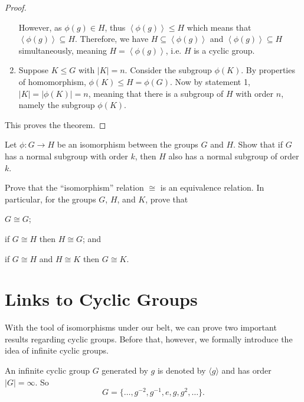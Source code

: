 \begin{proof}
\begin{enumerate}
        However, as $\phi(g) \in H$, thus $\left\langle \phi(g) \right\rangle \leq H$ which means that $\left\langle \phi(g) \right\rangle \subseteq H$. Therefore, we have $H \subseteq \left\langle \phi(g) \right\rangle$ and $\left\langle \phi(g) \right\rangle \subseteq H$ simultaneously, meaning $H = \left\langle \phi(g) \right\rangle$, i.e. $H$ is a cyclic group.

        \item Suppose $K \leq G$ with $|K| = n$. Consider the subgroup $\phi(K)$. By properties of homomorphism, $\phi(K) \leq H = \phi(G)$. Now by statement 1, $|K| = |\phi(K)| = n$, meaning that there is a subgroup of $H$ with order $n$, namely the subgroup $\phi(K)$.
    \end{enumerate}

    This proves the theorem.
\end{proof}

\begin{exercise}
    Let $\phi: G \to H$ be an isomorphism between the groups $G$ and $H$. Show that if $G$ has a normal subgroup with order $k$, then $H$ also has a normal subgroup of order $k$.
\end{exercise}

\begin{exercise}
    Prove that the ``isomorphism'' relation $\cong$ is an equivalence relation. In particular, for the groups $G$, $H$, and $K$, prove that
    \begin{partquestions}{\alph*}
        \item $G \cong G$;
        \item if $G \cong H$ then $H \cong G$; and
        \item if $G \cong H$ and $H \cong K$ then $G \cong K$.
    \end{partquestions}
\end{exercise}

\section{Links to Cyclic Groups}
With the tool of isomorphisms under our belt, we can prove two important results regarding cyclic groups. Before that, however, we formally introduce the idea of infinite cyclic groups.
\begin{definition}
    An infinite cyclic group $G$ generated by $g$ is denoted by $\langle g \rangle$ and has order $|G| = \infty$. So
    \[
        G = \{\dots, g^{-2}, g^{-1}, e, g, g^2, \dots\}.
    \]
\end{definition}

